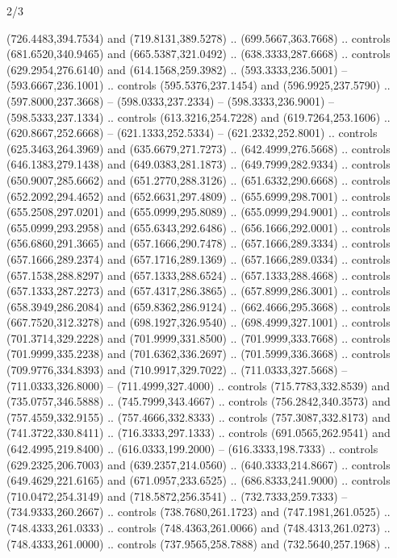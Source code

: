 \begin{flagdescription}{2/3}
\begin{scope}[xshift=0.5\flaglength,yshift=0.5\flagwidth,scale=\flagwidth/525.28]
\begin{scope}[y=0.1mm, x=0.1mm, yscale=-1,shift={(-381.5,-404)}]
\begin{scope}[shift={(5.25001,4.53053)},miter limit=4.00,line width=0.800\lw]
  (726.4483,394.7534) and (719.8131,389.5278) .. (699.5667,363.7668) .. controls
  (681.6520,340.9465) and (665.5387,321.0492) .. (638.3333,287.6668) .. controls
  (629.2954,276.6140) and (614.1568,259.3982) .. (593.3333,236.5001) --
  (593.6667,236.1001) .. controls (595.5376,237.1454) and (596.9925,237.5790) ..
  (597.8000,237.3668) -- (598.0333,237.2334) -- (598.3333,236.9001) --
  (598.5333,237.1334) .. controls (613.3216,254.7228) and (619.7264,253.1606) ..
  (620.8667,252.6668) -- (621.1333,252.5334) -- (621.2332,252.8001) .. controls
  (625.3463,264.3969) and (635.6679,271.7273) .. (642.4999,276.5668) .. controls
  (646.1383,279.1438) and (649.0383,281.1873) .. (649.7999,282.9334) .. controls
  (650.9007,285.6662) and (651.2770,288.3126) .. (651.6332,290.6668) .. controls
  (652.2092,294.4652) and (652.6631,297.4809) .. (655.6999,298.7001) .. controls
  (655.2508,297.0201) and (655.0999,295.8089) .. (655.0999,294.9001) .. controls
  (655.0999,293.2958) and (655.6343,292.6486) .. (656.1666,292.0001) .. controls
  (656.6860,291.3665) and (657.1666,290.7478) .. (657.1666,289.3334) .. controls
  (657.1666,289.2374) and (657.1716,289.1369) .. (657.1666,289.0334) .. controls
  (657.1538,288.8297) and (657.1333,288.6524) .. (657.1333,288.4668) .. controls
  (657.1333,287.2273) and (657.4317,286.3865) .. (657.8999,286.3001) .. controls
  (658.3949,286.2084) and (659.8362,286.9124) .. (662.4666,295.3668) .. controls
  (667.7520,312.3278) and (698.1927,326.9540) .. (698.4999,327.1001) .. controls
  (701.3714,329.2228) and (701.9999,331.8500) .. (701.9999,333.7668) .. controls
  (701.9999,335.2238) and (701.6362,336.2697) .. (701.5999,336.3668) .. controls
  (709.9776,334.8393) and (710.9917,329.7022) .. (711.0333,327.5668) --
  (711.0333,326.8000) -- (711.4999,327.4000) .. controls (715.7783,332.8539) and
  (735.0757,346.5888) .. (745.7999,343.4667) .. controls (756.2842,340.3573) and
  (757.4559,332.9155) .. (757.4666,332.8333) .. controls (757.3087,332.8173) and
  (741.3722,330.8411) .. (716.3333,297.1333) .. controls (691.0565,262.9541) and
  (642.4995,219.8400) .. (616.0333,199.2000) -- (616.3333,198.7333) .. controls
  (629.2325,206.7003) and (639.2357,214.0560) .. (640.3333,214.8667) .. controls
  (649.4629,221.6165) and (671.0957,233.6525) .. (686.8333,241.9000) .. controls
  (710.0472,254.3149) and (718.5872,256.3541) .. (732.7333,259.7333) --
  (734.9333,260.2667) .. controls (738.7680,261.1723) and (747.1981,261.0525) ..
  (748.4333,261.0333) .. controls (748.4363,261.0066) and (748.4313,261.0273) ..
  (748.4333,261.0000) .. controls (737.9565,258.7888) and (732.5640,257.1968) ..

\end{scope}
\end{scope}
\end{scope}
\end{flagdescription}

